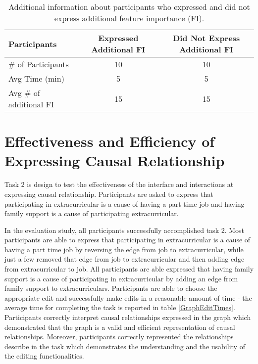 \begin{table}[]
\centering
\begin{tabular}{lcc}
\hline
Participants            & Expressed Additional FI & Did Not Express Additional FI \\ \hline
\# of Participants      & 10                      & 10                            \\
Avg Time (min)          & 5                       & 5                             \\
Avg \# of additional FI & 15                      & 15                            \\ \hline
\end{tabular}
\caption{Additional information about participants who expressed and did not express additional feature importance (FI).}
\label{ExpressedAdditionalImportance}
\end{table}

\section{ Effectiveness and Efficiency of Expressing Causal Relationship}
Task 2 is design to test the effectiveness of the interface and interactions at expressing causal relationship. Participants are asked to express that participating in extracurricular is a cause of having a part time job and having family support is a cause of participating extracurricular.

In the evaluation study, all participants successfully accomplished task 2. Most participants are able to express that participating in extracurricular is a cause of having a part time job by reversing the edge from job to extracurricular, while just a few removed that edge from job to extracurricular and then adding edge from extracurricular to job. All participants are able expressed that having family support is a cause of participating in extracurricular by adding an edge from family support to extracurriculars. Participants are able to choose the appropriate edit and successfully make edits in a reasonable amount of time - the average time for completing the task is reported in table \ref{GraphEditTimes}. Participants correctly interpret causal relationships expressed in the graph which demonstrated that the graph is a valid and efficient representation of causal relationships. Moreover, participants correctly represented the relationships describe in the task which demonstrates the understanding and the usability of the editing functionalities.

